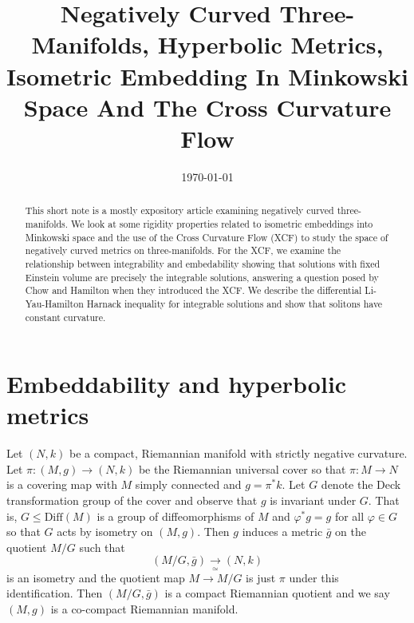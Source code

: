 \documentclass[a4paper,12pt]{amsart}
\begin{document}
\title[Negatively Curved Three Manifolds]{Negatively Curved Three-Manifolds, Hyperbolic Metrics, Isometric Embedding In Minkowski Space And The Cross Curvature Flow}

\date{\today}



\begin{abstract}
This short note is a mostly expository article examining negatively curved three-manifolds. We look at some rigidity properties related to isometric embeddings into Minkowski space and the use of the Cross Curvature Flow (XCF) to study the space of negatively curved metrics on three-manifolds. For the XCF, we examine the relationship between integrability and embedability showing that solutions with fixed Einstein volume are precisely the integrable solutions, answering a question posed by Chow and Hamilton when they introduced the XCF. We describe the differential Li-Yau-Hamilton Harnack inequality for integrable solutions and show that solitons have constant curvature.
\end{abstract}

\maketitle

\section{Embeddability and hyperbolic metrics}
\label{sec:intro}



Let \((N, k)\) be a compact, Riemannian manifold with strictly negative curvature. Let \(\pi\colon (M, g) \to (N, k)\) be the Riemannian universal cover so that \(\pi : M \to N\) is a covering map with \(M\) simply connected and \(g = \pi^{\ast} k\). Let \(G\) denote the Deck transformation group of the cover and observe that \(g\) is invariant under \(G\). That is, \(G \leq \text{Diff}(M)\) is a group of diffeomorphisms of \(M\) and \(\varphi^{\ast} g = g\) for all \(\varphi \in G\) so that \(G\) acts by isometry on \((M, g)\). Then \(g\) induces a metric \(\bar{g}\) on the quotient \(M/G\) such that
\[
(M/G, \bar{g}) \underset{\simeq}{\to} (N, k)
\]
is an isometry and the quotient map \(M \to M/G\) is just \(\pi\) under this identification. Then \((M/G, \bar{g})\) is a compact Riemannian quotient and we say \((M, g)\) is a co-compact Riemannian manifold.
\end{document}

